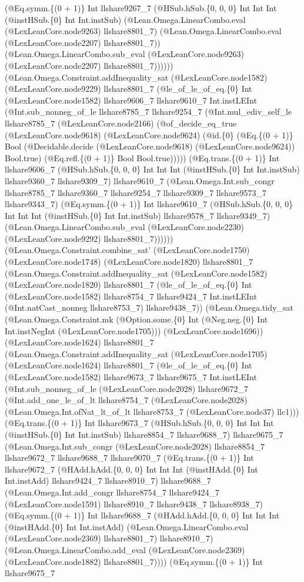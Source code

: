 \documentclass[11pt]{article}
\begin{document}
(@Eq.symm.\{(0 + 1)\} Int llshare9267\_7 (@HSub.hSub.\{0, 0, 0\} Int Int Int (@instHSub.\{0\} Int Int.instSub) (@Lean.Omega.LinearCombo.eval (@LexLeanCore.node9263) llshare8801\_7) (@Lean.Omega.LinearCombo.eval (@LexLeanCore.node2207) llshare8801\_7)) (@Lean.Omega.LinearCombo.sub\_eval (@LexLeanCore.node9263) (@LexLeanCore.node2207) llshare8801\_7)))))) (@Lean.Omega.Constraint.addInequality\_sat (@LexLeanCore.node1582) (@LexLeanCore.node9229) llshare8801\_7 (@le\_of\_le\_of\_eq.\{0\} Int (@LexLeanCore.node1582) llshare9606\_7 llshare9610\_7 Int.instLEInt (@Int.sub\_nonneg\_of\_le llshare8785\_7 llshare9254\_7 (@Int.mul\_ediv\_self\_le llshare8785\_7 (@LexLeanCore.node2166) (@of\_decide\_eq\_true (@LexLeanCore.node9618) (@LexLeanCore.node9624) (@id.\{0\} (@Eq.\{(0 + 1)\} Bool (@Decidable.decide (@LexLeanCore.node9618) (@LexLeanCore.node9624)) Bool.true) (@Eq.refl.\{(0 + 1)\} Bool Bool.true))))) (@Eq.trans.\{(0 + 1)\} Int llshare9606\_7 (@HSub.hSub.\{0, 0, 0\} Int Int Int (@instHSub.\{0\} Int Int.instSub) llshare9360\_7 llshare9309\_7) llshare9610\_7 (@Lean.Omega.Int.sub\_congr llshare8785\_7 llshare9360\_7 llshare9254\_7 llshare9309\_7 llshare9573\_7 llshare9343\_7) (@Eq.symm.\{(0 + 1)\} Int llshare9610\_7 (@HSub.hSub.\{0, 0, 0\} Int Int Int (@instHSub.\{0\} Int Int.instSub) llshare9578\_7 llshare9349\_7) (@Lean.Omega.LinearCombo.sub\_eval (@LexLeanCore.node2230) (@LexLeanCore.node9292) llshare8801\_7)))))) (@Lean.Omega.Constraint.combine\_sat' (@LexLeanCore.node1750) (@LexLeanCore.node1748) (@LexLeanCore.node1820) llshare8801\_7 (@Lean.Omega.Constraint.addInequality\_sat (@LexLeanCore.node1582) (@LexLeanCore.node1820) llshare8801\_7 (@le\_of\_le\_of\_eq.\{0\} Int (@LexLeanCore.node1582) llshare8754\_7 llshare9424\_7 Int.instLEInt (@Int.natCast\_nonneg llshare8753\_7) llshare9438\_7)) (@Lean.Omega.tidy\_sat (@Lean.Omega.Constraint.mk (@Option.some.\{0\} Int (@Neg.neg.\{0\} Int Int.instNegInt (@LexLeanCore.node1705))) (@LexLeanCore.node1696)) (@LexLeanCore.node1624) llshare8801\_7 (@Lean.Omega.Constraint.addInequality\_sat (@LexLeanCore.node1705) (@LexLeanCore.node1624) llshare8801\_7 (@le\_of\_le\_of\_eq.\{0\} Int (@LexLeanCore.node1582) llshare9673\_7 llshare9675\_7 Int.instLEInt (@Int.sub\_nonneg\_of\_le (@LexLeanCore.node2028) llshare9672\_7 (@Int.add\_one\_le\_of\_lt llshare8754\_7 (@LexLeanCore.node2028) (@Lean.Omega.Int.ofNat\_lt\_of\_lt llshare8753\_7 (@LexLeanCore.node37) llc1))) (@Eq.trans.\{(0 + 1)\} Int llshare9673\_7 (@HSub.hSub.\{0, 0, 0\} Int Int Int (@instHSub.\{0\} Int Int.instSub) llshare8854\_7 llshare9688\_7) llshare9675\_7 (@Lean.Omega.Int.sub\_congr (@LexLeanCore.node2028) llshare8854\_7 llshare9672\_7 llshare9688\_7 llshare9070\_7 (@Eq.trans.\{(0 + 1)\} Int llshare9672\_7 (@HAdd.hAdd.\{0, 0, 0\} Int Int Int (@instHAdd.\{0\} Int Int.instAdd) llshare9424\_7 llshare8910\_7) llshare9688\_7 (@Lean.Omega.Int.add\_congr llshare8754\_7 llshare9424\_7 (@LexLeanCore.node1591) llshare8910\_7 llshare9438\_7 llshare8938\_7) (@Eq.symm.\{(0 + 1)\} Int llshare9688\_7 (@HAdd.hAdd.\{0, 0, 0\} Int Int Int (@instHAdd.\{0\} Int Int.instAdd) (@Lean.Omega.LinearCombo.eval (@LexLeanCore.node2369) llshare8801\_7) llshare8910\_7) (@Lean.Omega.LinearCombo.add\_eval (@LexLeanCore.node2369) (@LexLeanCore.node1882) llshare8801\_7)))) (@Eq.symm.\{(0 + 1)\} Int llshare9675\_7 
\end{document}
